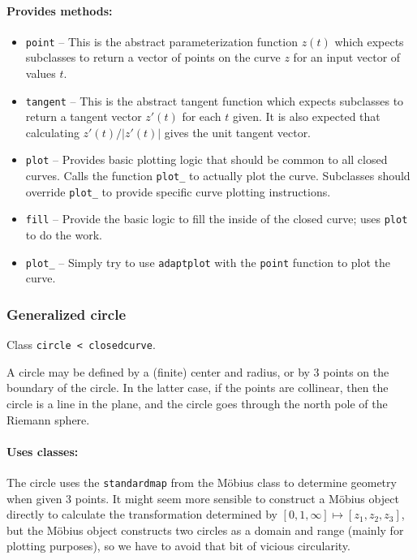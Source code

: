 \documentclass[12pt]{article}
\begin{document}
\paragraph{Provides methods:}
\begin{itemize}
  \item \verb+point+ -- This is the abstract parameterization function $z(t)$ which expects subclasses to return a vector of points on the curve $z$ for an input vector of values $t$.
  \item \verb+tangent+ -- This is the abstract tangent function which expects subclasses to return a tangent vector $z'(t)$ for each $t$ given. It is also expected that calculating $z'(t)/|z'(t)|$ gives the unit tangent vector.
  \item \verb+plot+ -- Provides basic plotting logic that should be common to all closed curves. Calls the function \verb+plot_+ to actually plot the curve. Subclasses should override \verb+plot_+ to provide specific curve plotting instructions.
  \item \verb+fill+ -- Provide the basic logic to fill the inside of the closed curve; uses \verb+plot+ to do the work.
  \item \verb+plot_+ -- Simply try to use \verb+adaptplot+ with the \verb+point+ function to plot the curve.
\end{itemize}

\subsubsection{Generalized circle}
Class \verb+circle < closedcurve+.

A circle may be defined by a (finite) center and radius, or by 3 points on the boundary of the circle. In the latter case, if the points are collinear, then the circle is a line in the plane, and the circle goes through the north pole of the Riemann sphere.

\paragraph{Uses classes:} The circle uses the \verb+standardmap+ from the M\"obius class to determine geometry when given 3 points. It might seem more sensible to construct a M\"obius object directly to calculate the transformation determined by $[0,1,\infty]\mapsto[z_1, z_2, z_3]$, but the M\"obius object constructs two circles as a domain and range (mainly for plotting purposes), so we have to avoid that bit of vicious circularity.
\end{document}
